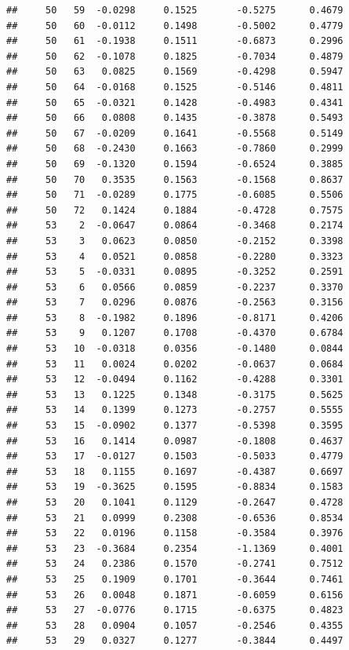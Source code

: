 \documentclass[
]{article}
\begin{document}
\begin{verbatim}
##     50   59  -0.0298     0.1525       -0.5275      0.4679  
##     50   60  -0.0112     0.1498       -0.5002      0.4779  
##     50   61  -0.1938     0.1511       -0.6873      0.2996  
##     50   62  -0.1078     0.1825       -0.7034      0.4879  
##     50   63   0.0825     0.1569       -0.4298      0.5947  
##     50   64  -0.0168     0.1525       -0.5146      0.4811  
##     50   65  -0.0321     0.1428       -0.4983      0.4341  
##     50   66   0.0808     0.1435       -0.3878      0.5493  
##     50   67  -0.0209     0.1641       -0.5568      0.5149  
##     50   68  -0.2430     0.1663       -0.7860      0.2999  
##     50   69  -0.1320     0.1594       -0.6524      0.3885  
##     50   70   0.3535     0.1563       -0.1568      0.8637  
##     50   71  -0.0289     0.1775       -0.6085      0.5506  
##     50   72   0.1424     0.1884       -0.4728      0.7575  
##     53    2  -0.0647     0.0864       -0.3468      0.2174  
##     53    3   0.0623     0.0850       -0.2152      0.3398  
##     53    4   0.0521     0.0858       -0.2280      0.3323  
##     53    5  -0.0331     0.0895       -0.3252      0.2591  
##     53    6   0.0566     0.0859       -0.2237      0.3370  
##     53    7   0.0296     0.0876       -0.2563      0.3156  
##     53    8  -0.1982     0.1896       -0.8171      0.4206  
##     53    9   0.1207     0.1708       -0.4370      0.6784  
##     53   10  -0.0318     0.0356       -0.1480      0.0844  
##     53   11   0.0024     0.0202       -0.0637      0.0684  
##     53   12  -0.0494     0.1162       -0.4288      0.3301  
##     53   13   0.1225     0.1348       -0.3175      0.5625  
##     53   14   0.1399     0.1273       -0.2757      0.5555  
##     53   15  -0.0902     0.1377       -0.5398      0.3595  
##     53   16   0.1414     0.0987       -0.1808      0.4637  
##     53   17  -0.0127     0.1503       -0.5033      0.4779  
##     53   18   0.1155     0.1697       -0.4387      0.6697  
##     53   19  -0.3625     0.1595       -0.8834      0.1583  
##     53   20   0.1041     0.1129       -0.2647      0.4728  
##     53   21   0.0999     0.2308       -0.6536      0.8534  
##     53   22   0.0196     0.1158       -0.3584      0.3976  
##     53   23  -0.3684     0.2354       -1.1369      0.4001  
##     53   24   0.2386     0.1570       -0.2741      0.7512  
##     53   25   0.1909     0.1701       -0.3644      0.7461  
##     53   26   0.0048     0.1871       -0.6059      0.6156  
##     53   27  -0.0776     0.1715       -0.6375      0.4823  
##     53   28   0.0904     0.1057       -0.2546      0.4355  
##     53   29   0.0327     0.1277       -0.3844      0.4497  

\end{verbatim}
\end{document}
